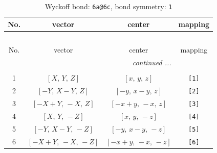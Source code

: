 \documentclass[fleqn,8pt]{jsarticle}
\begin{document}
\begin{longtable}{cccc}
\caption{Wyckoff bond: {\tt 6a@6c}, bond symmetry: {\tt 1}}
 \\
 \hline \hline
No. & vector & center & mapping \\ \hline \endfirsthead

\multicolumn{3}{l}{\tablename\ \thetable{}} \\
 \hline \hline
No. & vector & center & mapping \\ \hline \endhead

 \hline \hline
\multicolumn{3}{r}{\footnotesize\it continued ...} \\ \endfoot

 \hline \hline
\multicolumn{3}{r}{} \\ \endlastfoot

1 & $\left[ X,\, Y,\, Z \right]$ & $\left[ x,\, y,\, z \right]$ & {\tt [1]} \\ \hline
2 & $\left[ - Y,\, X - Y,\, Z \right]$ & $\left[ - y,\, x - y,\, z \right]$ & {\tt [2]} \\ \hline
3 & $\left[ - X + Y,\, - X,\, Z \right]$ & $\left[ - x + y,\, - x,\, z \right]$ & {\tt [3]} \\ \hline
4 & $\left[ X,\, Y,\, - Z \right]$ & $\left[ x,\, y,\, - z \right]$ & {\tt [4]} \\ \hline
5 & $\left[ - Y,\, X - Y,\, - Z \right]$ & $\left[ - y,\, x - y,\, - z \right]$ & {\tt [5]} \\ \hline
6 & $\left[ - X + Y,\, - X,\, - Z \right]$ & $\left[ - x + y,\, - x,\, - z \right]$ & {\tt [6]} \\
\end{longtable}
\end{document}
